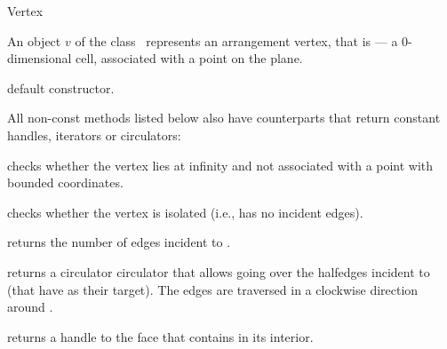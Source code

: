 
\ccRefPageBegin

\begin{ccRefClass}{Vertex}

\ccDefinition
An object $v$ of the class \ccRefName\ represents an arrangement vertex,
that is --- a $0$-dimensional cell, associated with a point on the plane. 

\ccInheritsFrom

\ccThreeToTwo

\ccCreation
{}

    {default constructor.}    

\ccAccessFunctions

All non-const methods listed below also have  counterparts
that return constant handles, iterators or circulators:

    {checks whether the vertex lies at infinity and not associated with
     a point with bounded coordinates.}

    {checks whether the vertex is isolated (i.e., has no incident edges).}

    {returns the number of edges incident to \ccVar{}.}

\ccThreeToTwo

    {returns a circulator circulator that allows going over the halfedges
     incident to \ccVar{} (that have \ccVar{} as their target).
     The edges are traversed in a clockwise direction around \ccVar{}.
     }

\ccThreeToTwo

    {returns a handle to the face that contains \ccVar{} in its interior.
     }


\end{ccRefClass}
